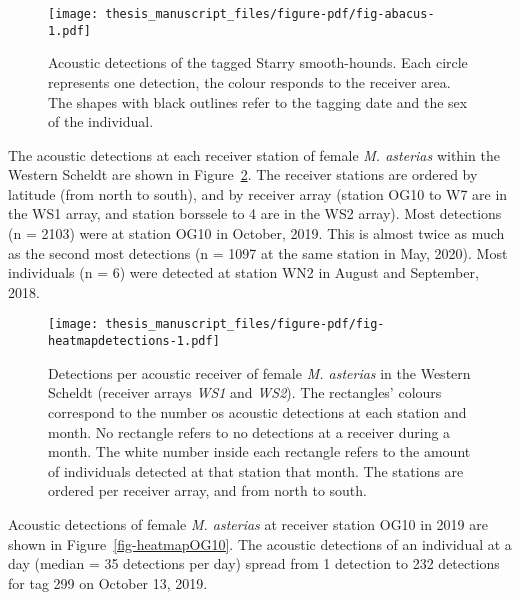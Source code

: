 \documentclass[
  authoryear,
  review,
  3p]{elsarticle}
\begin{document}
\begin{figure}[H]

{\centering \texttt{[image: thesis\_manuscript\_files/figure-pdf/fig-abacus-1.pdf]}

}

\caption{\label{fig-abacus}Acoustic detections of the tagged Starry
smooth-hounds. Each circle represents one detection, the colour responds
to the receiver area. The shapes with black outlines refer to the
tagging date and the sex of the individual.}

\end{figure}

The acoustic detections at each receiver station of female \emph{M.
asterias} within the Western Scheldt are shown in
Figure~\ref{fig-heatmapdetections}. The receiver stations are ordered by
latitude (from north to south), and by receiver array (station OG10 to
W7 are in the WS1 array, and station borssele to 4 are in the WS2
array). Most detections (n = 2103) were at station OG10 in October,
2019. This is almost twice as much as the second most detections (n =
1097 at the same station in May, 2020). Most individuals (n = 6) were
detected at station WN2 in August and September, 2018.

\begin{figure}[H]

{\centering \texttt{[image: thesis\_manuscript\_files/figure-pdf/fig-heatmapdetections-1.pdf]}

}

\caption{\label{fig-heatmapdetections}Detections per acoustic receiver
of female \emph{M. asterias} in the Western Scheldt (receiver arrays
\emph{WS1} and \emph{WS2}). The rectangles' colours correspond to the
number os acoustic detections at each station and month. No rectangle
refers to no detections at a receiver during a month. The white number
inside each rectangle refers to the amount of individuals detected at
that station that month. The stations are ordered per receiver array,
and from north to south.}

\end{figure}

Acoustic detections of female \emph{M. asterias} at receiver station
OG10 in 2019 are shown in Figure~\ref{fig-heatmapOG10}. The acoustic
detections of an individual at a day (median = 35 detections per day)
spread from 1 detection to 232 detections for tag 299 on October 13,
2019.
\end{document}
